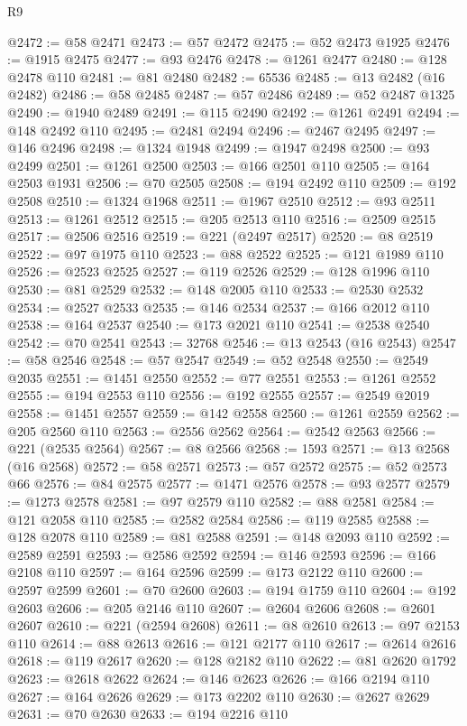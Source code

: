 \begin{lexlean}{R9}
\begin{coremodule}
@2472 := @58 @2471
@2473 := @57 @2472
@2475 := @52 @2473 @1925
@2476 := @1915 @2475
@2477 := @93 @2476
@2478 := @1261 @2477
@2480 := @128 @2478 @110
@2481 := @81 @2480
@2482 := 65536
@2485 := @13 @2482 (@16 @2482)
@2486 := @58 @2485
@2487 := @57 @2486
@2489 := @52 @2487 @1325
@2490 := @1940 @2489
@2491 := @115 @2490
@2492 := @1261 @2491
@2494 := @148 @2492 @110
@2495 := @2481 @2494
@2496 := @2467 @2495
@2497 := @146 @2496
@2498 := @1324 @1948
@2499 := @1947 @2498
@2500 := @93 @2499
@2501 := @1261 @2500
@2503 := @166 @2501 @110
@2505 := @164 @2503 @1931
@2506 := @70 @2505
@2508 := @194 @2492 @110
@2509 := @192 @2508
@2510 := @1324 @1968
@2511 := @1967 @2510
@2512 := @93 @2511
@2513 := @1261 @2512
@2515 := @205 @2513 @110
@2516 := @2509 @2515
@2517 := @2506 @2516
@2519 := @221 (@2497 @2517)
@2520 := @8 @2519
@2522 := @97 @1975 @110
@2523 := @88 @2522
@2525 := @121 @1989 @110
@2526 := @2523 @2525
@2527 := @119 @2526
@2529 := @128 @1996 @110
@2530 := @81 @2529
@2532 := @148 @2005 @110
@2533 := @2530 @2532
@2534 := @2527 @2533
@2535 := @146 @2534
@2537 := @166 @2012 @110
@2538 := @164 @2537
@2540 := @173 @2021 @110
@2541 := @2538 @2540
@2542 := @70 @2541
@2543 := 32768
@2546 := @13 @2543 (@16 @2543)
@2547 := @58 @2546
@2548 := @57 @2547
@2549 := @52 @2548
@2550 := @2549 @2035
@2551 := @1451 @2550
@2552 := @77 @2551
@2553 := @1261 @2552
@2555 := @194 @2553 @110
@2556 := @192 @2555
@2557 := @2549 @2019
@2558 := @1451 @2557
@2559 := @142 @2558
@2560 := @1261 @2559
@2562 := @205 @2560 @110
@2563 := @2556 @2562
@2564 := @2542 @2563
@2566 := @221 (@2535 @2564)
@2567 := @8 @2566
@2568 := 1593
@2571 := @13 @2568 (@16 @2568)
@2572 := @58 @2571
@2573 := @57 @2572
@2575 := @52 @2573 @66
@2576 := @84 @2575
@2577 := @1471 @2576
@2578 := @93 @2577
@2579 := @1273 @2578
@2581 := @97 @2579 @110
@2582 := @88 @2581
@2584 := @121 @2058 @110
@2585 := @2582 @2584
@2586 := @119 @2585
@2588 := @128 @2078 @110
@2589 := @81 @2588
@2591 := @148 @2093 @110
@2592 := @2589 @2591
@2593 := @2586 @2592
@2594 := @146 @2593
@2596 := @166 @2108 @110
@2597 := @164 @2596
@2599 := @173 @2122 @110
@2600 := @2597 @2599
@2601 := @70 @2600
@2603 := @194 @1759 @110
@2604 := @192 @2603
@2606 := @205 @2146 @110
@2607 := @2604 @2606
@2608 := @2601 @2607
@2610 := @221 (@2594 @2608)
@2611 := @8 @2610
@2613 := @97 @2153 @110
@2614 := @88 @2613
@2616 := @121 @2177 @110
@2617 := @2614 @2616
@2618 := @119 @2617
@2620 := @128 @2182 @110
@2622 := @81 @2620 @1792
@2623 := @2618 @2622
@2624 := @146 @2623
@2626 := @166 @2194 @110
@2627 := @164 @2626
@2629 := @173 @2202 @110
@2630 := @2627 @2629
@2631 := @70 @2630
@2633 := @194 @2216 @110

\end{coremodule}
\end{lexlean}
